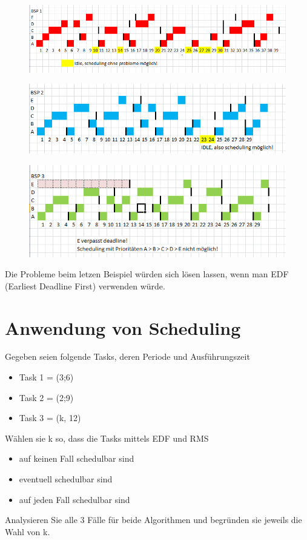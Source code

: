 \documentclass[12pt,a4paper,ngerman]{article}
\begin{document}
\pagebreak
\begin{figure}[h!]
\centering
\includegraphics[width=\columnwidth]{figures/bsp1.jpg} 
\end{figure}
\begin{figure}[h!]
\centering
\includegraphics[width=\columnwidth]{figures/bsp2.jpg} 
\end{figure}
\begin{figure}[h!]
\centering
\includegraphics[width=\columnwidth]{figures/bsp3.jpg} 
\end{figure}
Die Probleme beim letzen Beispiel würden sich lösen lassen, wenn man EDF (Earliest Deadline First) verwenden würde. 
\pagebreak

\section*{Anwendung von Scheduling}


\begin{framed}
Gegeben seien folgende Tasks, deren Periode und Ausführungszeit
\begin{itemize}
\item Task 1 = (3;6)
\item Task 2 = (2;9)
\item Task 3 = (k, 12)
\end{itemize}
Wählen sie k so, dass die Tasks mittels EDF und RMS
\begin{itemize}
\item auf keinen Fall schedulbar sind
\item eventuell schedulbar sind
\item auf jeden Fall schedulbar sind
\end{itemize}
Analysieren Sie alle 3 Fälle für beide Algorithmen und begründen sie jeweils die Wahl von k. 
\end{framed}
\end{document}
